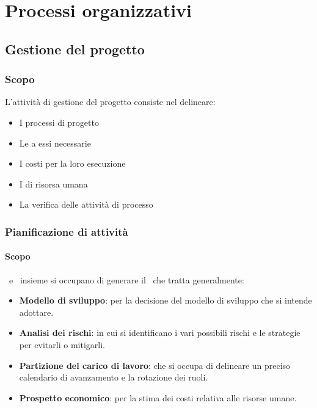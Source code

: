 \section{Processi organizzativi}

    \subsection{Gestione del progetto}

	    \subsubsection{Scopo}
	    L'attività di gestione del progetto consiste nel delineare:
	    \begin{itemize}
	    	\item I processi di progetto
	    	\item Le  a essi necessarie
	    	\item I costi per la loro esecuzione
	    	\item I  di risorsa umana
	    	\item La verifica delle attività di processo
	    \end{itemize}

		\subsubsection{Pianificazione di attività}

			\paragraph{Scopo}
			\Res\ e \Amm\ insieme si occupano di generare il \PdP\ che tratta generalmente:
			\begin{itemize}
				\item \textbf{Modello di sviluppo}: per la decisione del modello di sviluppo che si intende adottare.
				\item \textbf{Analisi dei rischi}: in cui si identificano i vari possibili rischi e le strategie per evitarli o mitigarli.
				\item \textbf{Partizione del carico di lavoro}: che si occupa di delineare un preciso calendario di avanzamento e la rotazione dei ruoli.
				\item \textbf{Prospetto economico}: per la stima dei costi relativa alle risorse umane.
			\end{itemize}

